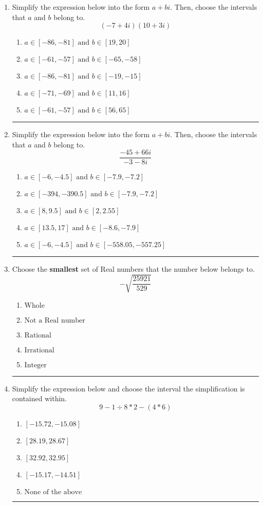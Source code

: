 \documentclass[14pt]{extbook}
\newcommand{\litem}[1]{\item#1\hspace*{-1cm}\rule{\textwidth}{0.4pt}}
\begin{document}
\begin{enumerate}
\litem{
Simplify the expression below into the form $a+bi$. Then, choose the intervals that $a$ and $b$ belong to.\[ (-7 + 4 i)(10 + 3 i) \]\begin{enumerate}[label=\Alph*.]
\item \( a \in [-86, -81] \text{ and } b \in [19, 20] \)
\item \( a \in [-61, -57] \text{ and } b \in [-65, -58] \)
\item \( a \in [-86, -81] \text{ and } b \in [-19, -15] \)
\item \( a \in [-71, -69] \text{ and } b \in [11, 16] \)
\item \( a \in [-61, -57] \text{ and } b \in [56, 65] \)

\end{enumerate} }
\litem{
Simplify the expression below into the form $a+bi$. Then, choose the intervals that $a$ and $b$ belong to.\[ \frac{-45 + 66 i}{-3 - 8 i} \]\begin{enumerate}[label=\Alph*.]
\item \( a \in [-6, -4.5] \text{ and } b \in [-7.9, -7.2] \)
\item \( a \in [-394, -390.5] \text{ and } b \in [-7.9, -7.2] \)
\item \( a \in [8, 9.5] \text{ and } b \in [2, 2.55] \)
\item \( a \in [13.5, 17] \text{ and } b \in [-8.6, -7.9] \)
\item \( a \in [-6, -4.5] \text{ and } b \in [-558.05, -557.25] \)

\end{enumerate} }
\litem{
Choose the \textbf{smallest} set of Real numbers that the number below belongs to.\[ -\sqrt{\frac{25921}{529}} \]\begin{enumerate}[label=\Alph*.]
\item \( \text{Whole} \)
\item \( \text{Not a Real number} \)
\item \( \text{Rational} \)
\item \( \text{Irrational} \)
\item \( \text{Integer} \)

\end{enumerate} }
\litem{
Simplify the expression below and choose the interval the simplification is contained within.\[ 9 - 1 \div 8 * 2 - (4 * 6) \]\begin{enumerate}[label=\Alph*.]
\item \( [-15.72, -15.08] \)
\item \( [28.19, 28.67] \)
\item \( [32.92, 32.95] \)
\item \( [-15.17, -14.51] \)
\item \( \text{None of the above} \)


\end{enumerate}}
\end{enumerate}
\end{document}
